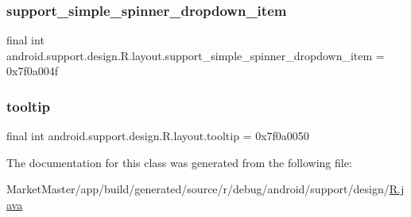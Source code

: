 \subsubsection{\texorpdfstring{support\+\_\+simple\+\_\+spinner\+\_\+dropdown\+\_\+item}{support\_simple\_spinner\_dropdown\_item}}
{\footnotesize\ttfamily final int android.\+support.\+design.\+R.\+layout.\+support\+\_\+simple\+\_\+spinner\+\_\+dropdown\+\_\+item = 0x7f0a004f\hspace{0.3cm}{\ttfamily [static]}}

\mbox{\label{classandroid_1_1support_1_1design_1_1R_1_1layout_a73389a6a386a258d603d5ece03ee9eb9}} 
\subsubsection{\texorpdfstring{tooltip}{tooltip}}
{\footnotesize\ttfamily final int android.\+support.\+design.\+R.\+layout.\+tooltip = 0x7f0a0050\hspace{0.3cm}{\ttfamily [static]}}



The documentation for this class was generated from the following file\+:\begin{DoxyCompactItemize}
\item 
Market\+Master/app/build/generated/source/r/debug/android/support/design/\mbox{\hyperlink{debug_2android_2support_2design_2R_8java}{R.\+java}}\end{DoxyCompactItemize}
